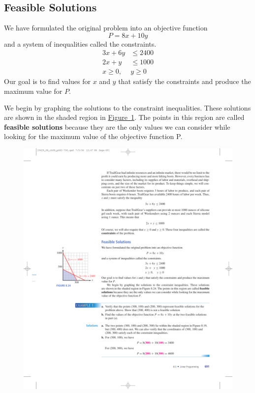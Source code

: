 \documentclass[10pt,]{book}
\newcommand{\terminology}[1]{\textbf{#1}}
\theoremstyle{plain}
\theoremstyle{definition}
\theoremstyle{definition}
\theoremstyle{definition}
\numberwithin{equation}{part}
\newcommand{\amp}{&}
\begin{document}
\subsection[{Feasible Solutions}]{Feasible Solutions}\label{subsection-2}
We have formulated the original problem into an objective function%
\begin{equation*}
P = 8x + 10y
\end{equation*}
and a system of inequalities called the constraints.%
\begin{align*}
3x + 6y \amp\le 2400
\\
2x + y \amp\le 1000
\\
x \ge 0, ~~\amp y \ge 0
\end{align*}
Our goal is to find values for \(x\) and \(y\) that satisfy the constraints and produce the maximum value for \(P\).%
\par
We begin by graphing the solutions to the constraint inequalities. These solutions are shown in the shaded region in \hyperref[fig-feasible-solutions]{Figure~\ref{fig-feasible-solutions}}. The points in this region are called \terminology{feasible solutions} because they are the only values we can consider while looking for the maximum value of the objective function P. \leavevmode%
\begin{figure}
\centering
\includegraphics[width=0.5\linewidth]{images/fig-feasible-solutions}
\caption{\label{fig-feasible-solutions}}
\end{figure}
%
\end{document}
